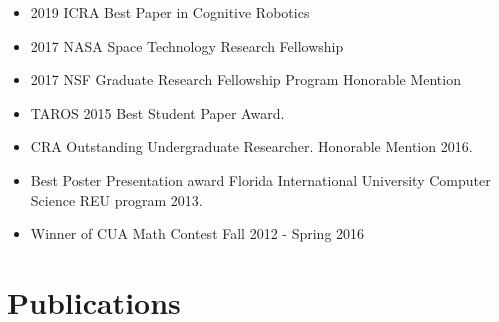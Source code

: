 \documentclass[11pt,a4paper,sans]{moderncv}        %
\begin{document}
\begin{itemize}

\item{2019 ICRA Best Paper in Cognitive Robotics}

\vspace{6pt}

\item{2017 NASA Space Technology Research Fellowship}

\vspace{6pt}

\item{2017 NSF Graduate Research Fellowship Program Honorable Mention}

\vspace{6pt}

\item{TAROS 2015 Best Student Paper Award.}

\vspace{6pt}

\item{CRA Outstanding Undergraduate Researcher.  Honorable Mention 2016.}

\vspace{6pt}

\item{Best Poster Presentation award Florida International University Computer Science REU program 2013.}

\vspace{6pt}

\item{Winner of CUA Math Contest Fall 2012 - Spring 2016}

\end{itemize}

\section{Publications}

\vspace{6pt}
\end{document}
